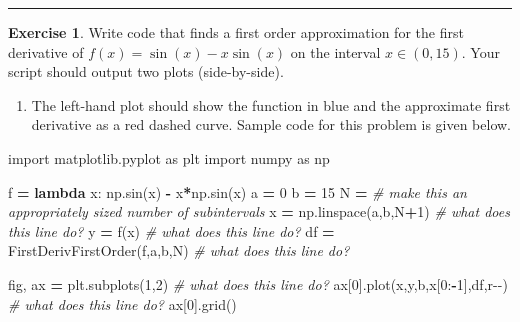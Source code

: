 \documentclass[
]{book}
\newenvironment{Shaded}{\begin{snugshade}}{\end{snugshade}}
\newcommand{\CommentTok}[1]{\textcolor[rgb]{0.56,0.35,0.01}{\textit{#1}}}
\newcommand{\DecValTok}[1]{\textcolor[rgb]{0.00,0.00,0.81}{#1}}
\newcommand{\ImportTok}[1]{#1}
\newcommand{\KeywordTok}[1]{\textcolor[rgb]{0.13,0.29,0.53}{\textbf{#1}}}
\newcommand{\NormalTok}[1]{#1}
\newcommand{\OperatorTok}[1]{\textcolor[rgb]{0.81,0.36,0.00}{\textbf{#1}}}
\newcommand{\StringTok}[1]{\textcolor[rgb]{0.31,0.60,0.02}{#1}}
\providecommand{\tightlist}{%
  \setlength{\itemsep}{0pt}\setlength{\parskip}{0pt}}
\theoremstyle{definition}
\theoremstyle{definition}
\theoremstyle{definition}
\newtheorem{exercise}{Exercise}[chapter]
\theoremstyle{remark}
\begin{document}
\begin{center}\rule{0.5\linewidth}{0.5pt}\end{center}

\begin{exercise}
\protect\hypertarget{exr:unnamed-chunk-157}{}{\label{exr:unnamed-chunk-157} }Write code that finds a first order approximation for the first
derivative of \(f(x) = \sin(x) - x\sin(x)\) on the interval
\(x \in (0,15)\). Your script should output two plots (side-by-side).

\begin{enumerate}
\def\labelenumi{\alph{enumi}.}
\tightlist
\item
  The left-hand plot should show the function in blue and the approximate first
  derivative as a red dashed curve. Sample code for this problem is given below.
\end{enumerate}
\end{exercise}

\begin{Shaded}
\begin{Highlighting}[]
\ImportTok{import}\NormalTok{ matplotlib.pyplot }\ImportTok{as}\NormalTok{ plt}
\ImportTok{import}\NormalTok{ numpy }\ImportTok{as}\NormalTok{ np}

\NormalTok{f }\OperatorTok{=} \KeywordTok{lambda}\NormalTok{ x: np.sin(x) }\OperatorTok{{-}}\NormalTok{ x}\OperatorTok{*}\NormalTok{np.sin(x)}
\NormalTok{a }\OperatorTok{=} \DecValTok{0}
\NormalTok{b }\OperatorTok{=} \DecValTok{15}
\NormalTok{N }\OperatorTok{=} \CommentTok{\# make this an appropriately sized number of subintervals}
\NormalTok{x }\OperatorTok{=}\NormalTok{ np.linspace(a,b,N}\OperatorTok{+}\DecValTok{1}\NormalTok{) }\CommentTok{\# what does this line do?}
\NormalTok{y }\OperatorTok{=}\NormalTok{ f(x) }\CommentTok{\# what does this line do?}
\NormalTok{df }\OperatorTok{=}\NormalTok{ FirstDerivFirstOrder(f,a,b,N) }\CommentTok{\# what does this line do?}

\NormalTok{fig, ax }\OperatorTok{=}\NormalTok{ plt.subplots(}\DecValTok{1}\NormalTok{,}\DecValTok{2}\NormalTok{) }\CommentTok{\# what does this line do?}
\NormalTok{ax[}\DecValTok{0}\NormalTok{].plot(x,y,}\StringTok{\textquotesingle{}b\textquotesingle{}}\NormalTok{,x[}\DecValTok{0}\NormalTok{:}\OperatorTok{{-}}\DecValTok{1}\NormalTok{],df,}\StringTok{\textquotesingle{}r{-}{-}\textquotesingle{}}\NormalTok{) }\CommentTok{\# what does this line do?}
\NormalTok{ax[}\DecValTok{0}\NormalTok{].grid()}
\end{Highlighting}
\end{Shaded}
\end{document}
